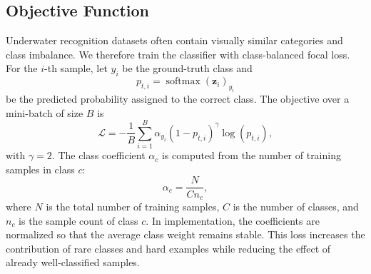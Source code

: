 \subsection{Objective Function}

Underwater recognition datasets often contain visually similar categories and class imbalance. We therefore train the classifier with class-balanced focal loss. For the $i$-th sample, let $y_i$ be the ground-truth class and
\begin{equation}
  p_{t,i}
  =
  \operatorname{softmax}(\mathbf{z}_{i})_{y_i}
  \label{eq:true-probability}
\end{equation}
be the predicted probability assigned to the correct class. The objective over a mini-batch of size $B$ is
\begin{equation}
  \mathcal{L}
  =
  -\frac{1}{B}
  \sum_{i=1}^{B}
  \alpha_{y_i}
  (1-p_{t,i})^{\gamma}
  \log(p_{t,i}),
  \label{eq:focal-loss}
\end{equation}
with $\gamma=2$. The class coefficient $\alpha_c$ is computed from the number of training samples in class $c$:
\begin{equation}
  \alpha_c
  =
  \frac{N}{C n_c},
  \label{eq:class-balanced-alpha}
\end{equation}
where $N$ is the total number of training samples, $C$ is the number of classes, and $n_c$ is the sample count of class $c$. In implementation, the coefficients are normalized so that the average class weight remains stable. This loss increases the contribution of rare classes and hard examples while reducing the effect of already well-classified samples.
